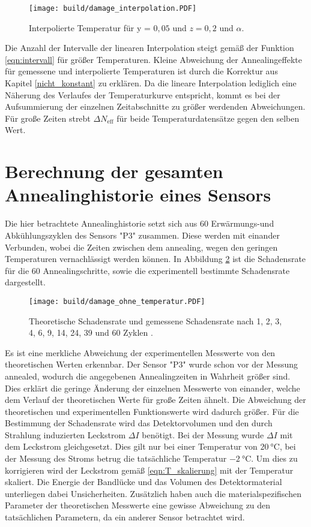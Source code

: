 \begin{figure}
    \texttt{[image: build/damage\_interpolation.PDF]}
\caption{Interpolierte Temperatur für y = $0,05$ und $z=0,2$ und $\alpha$.}
\label{fig:interpolation_damage}
\end{figure}

Die Anzahl der Intervalle der linearen Interpolation steigt gemäß der Funktion \ref{eqn:intervall}
für größer Temperaturen. Kleine Abweichung der Annealingeffekte für gemessene und
interpolierte Temperaturen ist durch die Korrektur aus Kapitel \ref{nicht_konstant}
zu erklären. Da die lineare Interpolation lediglich eine Näherung des Verlaufes der
Temperaturkurve entspricht, kommt es bei der Aufsummierung der einzelnen Zeitabschnitte
zu größer werdenden Abweichungen. Für große Zeiten strebt $\Delta N_{\mathrm{eff}}$
für beide Temperaturdatensätze gegen den selben Wert.

\section{Berechnung der gesamten Annealinghistorie eines Sensors}
Die hier betrachtete Annealinghistorie setzt sich aus 60 Erwärmungs-und
Abkühlungszyklen des Sensors "P3" zusammen. Diese werden mit einander Verbunden,
wobei die Zeiten zwischen dem annealing, wegen den geringen Temperaturen
vernachlässigt werden können.
In Abbildung \ref{fig:P_3} ist die Schadensrate für die 60 Annealingschritte,
sowie die experimentell bestimmte Schadensrate dargestellt.

\begin{figure}
    \texttt{[image: build/damage\_ohne\_temperatur.PDF]}
\caption{Theoretische Schadensrate und gemessene Schadensrate nach 1, 2, 3, 4, 6, 9, 14, 24, 39 und 60 Zyklen .}
\label{fig:P_3}
\end{figure}

Es ist eine merkliche Abweichung der experimentellen Messwerte von den theoretischen
Werten erkennbar. Der Sensor "P3" wurde schon vor der Messung annealed, wodurch
die angegebenen Annealingzeiten in Wahrheit größer sind. Dies erklärt die
geringe Änderung der einzelnen Messwerte von einander, welche dem
Verlauf der theoretischen Werte für große Zeiten ähnelt. Die Abweichung der theoretischen
und experimentellen Funktionswerte wird dadurch größer.
Für die Bestimmung der Schadensrate wird das Detektorvolumen und den durch
Strahlung induzierten Leckstrom $\Delta I$ benötigt. Bei der Messung wurde
$\Delta I$ mit dem Leckstrom gleichgesetzt. Dies gilt nur bei einer Temperatur
von $\SI{20}{\celsius}$, bei der Messung des Stroms betrug die tatsächliche Temperatur
$\SI{-2}{\celsius}$. Um dies zu korrigieren wird der Leckstrom gemäß \ref{eqn:T_skalierung}
mit der Temperatur skaliert. Die Energie der Bandlücke und das Volumen des Detektormaterial
unterliegen dabei Unsicherheiten. Zusätzlich haben auch die materialspezifischen Parameter
der theoretischen Messwerte eine gewisse Abweichung zu den tatsächlichen Parametern, da
ein anderer Sensor betrachtet wird.

